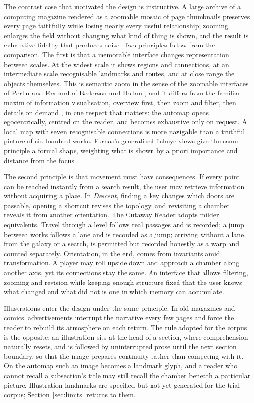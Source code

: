 \documentclass[11pt]{article}
\theoremstyle{remark}
\begin{document}
The contrast case that motivated the design is instructive. A large archive of a computing magazine rendered as a zoomable mosaic of page thumbnails preserves every page faithfully while losing nearly every useful relationship; zooming enlarges the field without changing what kind of thing is shown, and the result is exhaustive fidelity that produces noise. Two principles follow from the comparison. The first is that a memorable interface changes representation between scales. At the widest scale it shows regions and connections, at an intermediate scale recognisable landmarks and routes, and at close range the objects themselves. This is semantic zoom in the sense of the zoomable interfaces of Perlin and Fox and of Bederson and Hollan \cite{perlin1993,bederson1994}, and it differs from the familiar maxim of information visualisation, overview first, then zoom and filter, then details on demand \cite{shneiderman1996}, in one respect that matters: the automap opens egocentrically, centred on the reader, and becomes exhaustive only on request. A local map with seven recognisable connections is more navigable than a truthful picture of six hundred works. Furnas's generalised fisheye views give the same principle a formal shape, weighting what is shown by a priori importance and distance from the focus \cite{furnas1986}.

The second principle is that movement must have consequences. If every point can be reached instantly from a search result, the user may retrieve information without acquiring a place. In \emph{Descent}, finding a key changes which doors are passable, opening a shortcut revises the topology, and revisiting a chamber reveals it from another orientation. The Cutaway Reader adopts milder equivalents. Travel through a level follows real passages and is recorded; a jump between works follows a lane and is recorded as a jump; arriving without a lane, from the galaxy or a search, is permitted but recorded honestly as a warp and counted separately. Orientation, in the end, comes from invariants amid transformation. A player may roll upside down and approach a chamber along another axis, yet its connections stay the same. An interface that allows filtering, zooming and revision while keeping enough structure fixed that the user knows what changed and what did not is one in which memory can accumulate.

Illustrations enter the design under the same principle. In old magazines and comics, advertisements interrupt the narrative every few pages and force the reader to rebuild its atmosphere on each return. The rule adopted for the corpus is the opposite: an illustration sits at the head of a section, where comprehension naturally resets, and is followed by uninterrupted prose until the next section boundary, so that the image prepares continuity rather than competing with it. On the automap such an image becomes a landmark glyph, and a reader who cannot recall a subsection's title may still recall the chamber beneath a particular picture. Illustration landmarks are specified but not yet generated for the trial corpus; Section~\ref{sec:limits} returns to them.
\end{document}
